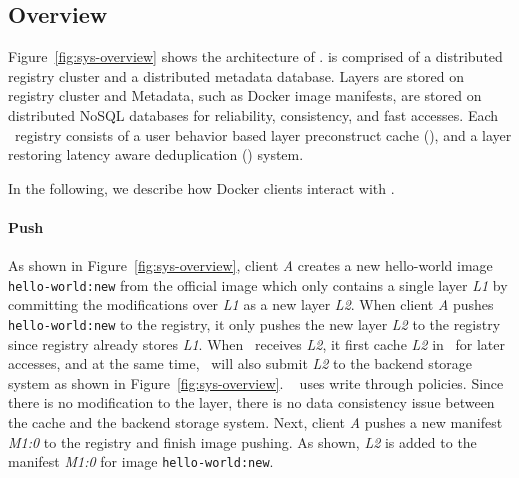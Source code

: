 \vspace{-4pt}
\subsection{Overview}
\label{sec:design}
\vspace{-4pt}



Figure~\ref{fig:sys-overview} shows the architecture of \sysname.
 \sysname is comprised of a distributed registry cluster and a distributed metadata database.
 Layers are stored on registry cluster and 
Metadata, such as Docker image manifests, are stored on distributed NoSQL databases for 
reliability, consistency, and fast accesses.
Each \sysname~registry consists of a user behavior based layer preconstruct cache (\preconstructcachename),
and a layer restoring latency aware deduplication (\dedupname) system.

In the following, we describe how Docker clients interact with \sysname.
\paragraph{Push}
As shown in Figure~\ref{fig:sys-overview}, client \textit{A} creates a new hello-world image
\texttt{hello-world:new}
from the official image which only contains a single layer \textit{L1}
by 
committing
the modifications over \textit{L1} as a new layer \textit{L2}.  
When client \textit{A} pushes \texttt{hello-world:new} to the registry,
it only pushes the new layer \textit{L2} to the registry since registry already stores \textit{L1}.
When \sysname~receives \textit{L2}, 
it first cache \textit{L2} in \preconstructcachename~for later accesses,
and at the same time, 
\sysname~will also submit \textit{L2} to the backend storage system as shown in Figure~\ref{fig:sys-overview}.
\preconstructcachename~ uses write through policies. 
Since there is no modification to the layer, 
there is no data consistency issue between the cache and the backend storage system.
Next, client \textit{A} pushes a new manifest \textit{M1:0} to the registry and finish image pushing.
As shown, \textit{L2} is added to the manifest \textit{M1:0} for image \texttt{hello-world:new}.


